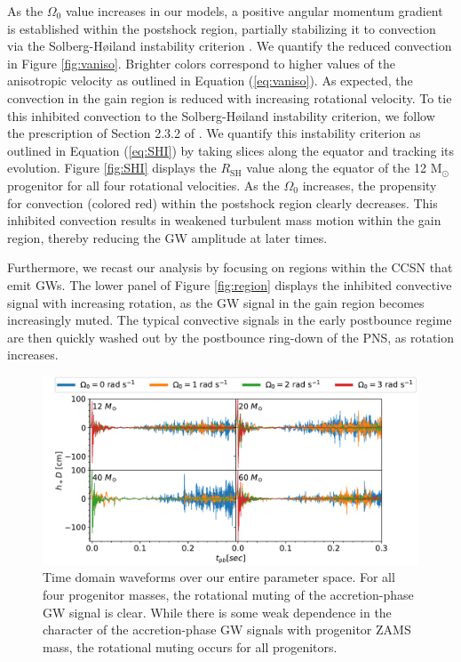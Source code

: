 \documentclass[twocolumn,times]{aastex62}  %
\newcommand{\Msun}{\ensuremath{\mathrm{M}_\odot}\xspace}
\begin{document}
  As the $\Omega_0$ value increases in our models, a positive angular momentum gradient is established within the postshock region, partially stabilizing it to convection via the Solberg-H{\o}iland instability criterion \citep{endal:1978,fryer:2000}.  We quantify the reduced convection in Figure \ref{fig:vaniso}.  Brighter colors correspond to higher values of the anisotropic velocity as outlined in Equation (\ref{eq:vaniso}).  As expected, the convection in the gain region is reduced with increasing rotational velocity.  To tie this inhibited convection to the Solberg-H{\o}iland instability criterion, we follow the prescription of Section 2.3.2 of \citet{heger:2000}.  We quantify this instability criterion as outlined in Equation (\ref{eq:SHI}) by taking slices along the equator and tracking its evolution.  Figure \ref{fig:SHI} displays the $R_{\mathrm{SH}}$ value along the equator of the 12 \Msun progenitor for all four rotational velocities.  As the $\Omega_0$ increases, the propensity for convection (colored red) within the postshock region clearly decreases.  This inhibited convection results in weakened turbulent mass motion within the gain region, thereby reducing the GW amplitude at later times.
 
Furthermore, we recast our analysis by focusing on regions within the CCSN that emit GWs.  The lower panel of Figure \ref{fig:region} displays the inhibited convective signal  with increasing rotation, as the GW signal in the gain region becomes increasingly muted.  The typical convective signals in the early postbounce regime are then quickly washed out by the postbounce ring-down of the PNS, as rotation increases.

\begin{figure}[t]
\includegraphics[width=\textwidth]{ccsn2D_M1_all.pdf}
\centering
\caption{Time domain waveforms over our entire parameter space.  For all four progenitor masses, the rotational muting of the accretion-phase GW signal is clear.  While there is some weak dependence in the character of the accretion-phase GW signals with progenitor ZAMS mass, the rotational muting occurs for all progenitors.}
\label{fig:ccsn_all}
\end{figure}
\end{document}
